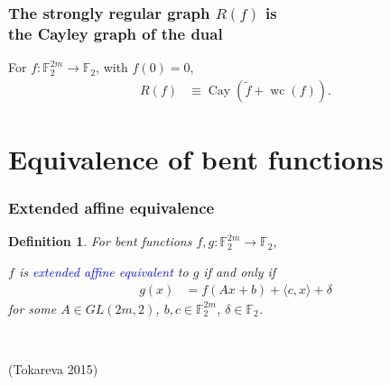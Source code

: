 \documentclass[pdf,sprung,slideColor,nocolorBG]{beamer}
\newenvironment{colortheme}[1]{
\def\ProvidesPackageRCS $##1${\relax}
\renewcommand{\ProcessOptions}{\relax}
\makeatletter

\makeatother
}{}
\newcommand{\slidecite}[1]{\tiny{(#1)}\normalsize{}}
\newcommand{\mb}[1]{\mathbb{#1}}
\newcommand{\Emph}[1]{\emph{\textcolor{blue}{#1}}}
\newcommand{\To}{\rightarrow}
\newcommand{\Cay}[1]{\operatorname{Cay}\left(#1\right)}
\newcommand{\dual}[1]{\widetilde{#1}}
\newcommand{\weightclass}[1]{\operatorname{wc}\left(#1\right)}
\newcommand{\F}{\mb{F}}
\newtheorem{Def}{Definition}
\begin{document}
\begin{colortheme}{jubata}

\begin{frame}
\frametitle{The strongly regular graph $R(f)$ is \\ the Cayley graph of the dual}

\begin{Theorem}
For $f : \F_2^{2m} \To \F_2$, with $f(0)=0$,
\begin{align*}
R(f) &\equiv \Cay{\dual{f} + \weightclass{f}}.
\end{align*}
\end{Theorem}

\end{frame}

\end{colortheme}

\section{Equivalence of bent functions}

\begin{colortheme}{seagull}

\begin{frame}
\frametitle{Extended affine equivalence}

\begin{Def}
For bent functions $f,g : \F_2^{2m} \To \F_2$,

$f$ is \Emph{extended affine equivalent} to $g$ if and only if
\begin{align*}
g(x) &= f(A x + b) + \langle c, x \rangle + \delta
\end{align*}
for some $A \in GL(2m,2)$, $b, c \in \F_2^{2m}$, $\delta \in \F_2$.
\end{Def}
~

\slidecite{Tokareva 2015}
\end{frame}

\end{colortheme}
\end{document}

